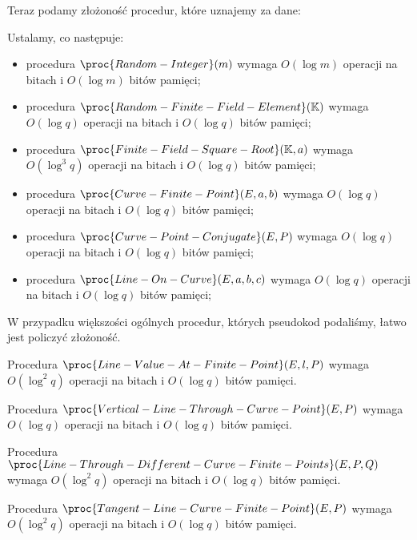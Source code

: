 \noindent
Teraz podamy złożoność procedur, które uznajemy za dane:

\begin{remark}
Ustalamy, co następuje:
\begin{itemize}
\item
procedura $\proc{Random-Integer}(m)$ wymaga
$O(\log m)$ operacji na bitach i $O(\log m)$ bitów pamięci;
\item
procedura $\proc{Random-Finite-Field-Element}(\K)$ wymaga
$O(\log q)$ operacji na bitach i $O(\log q)$ bitów pamięci;
\item
procedura $\proc{Finite-Field-Square-Root}(\K, a)$ wymaga
$O(\log^3 q)$ operacji na bitach i $O(\log q)$ bitów pamięci;
\item
procedura $\proc{Curve-Finite-Point}(E, a, b)$ wymaga
$O(\log q)$ operacji na bitach i $O(\log q)$ bitów pamięci;
\item
procedura $\proc{Curve-Point-Conjugate}(E, P)$ wymaga
$O(\log q)$ operacji na bitach \linebreak i $O(\log q)$ bitów pamięci;
\item
procedura $\proc{Line-On-Curve}(E, a, b, c)$ wymaga
$O(\log q)$ operacji na bitach i $O(\log q)$ bitów pamięci;
\end{itemize}
\end{remark}

\noindent
W przypadku większości ogólnych procedur, których pseudokod podaliśmy,
łatwo jest policzyć złożoność.

\begin{fact}
Procedura $\proc{Line-Value-At-Finite-Point}(E, l, P)$ wymaga
$O(\log^2 q)$ operacji na bitach i $O(\log q)$ bitów pamięci.
\end{fact}

\begin{fact}
Procedura $\proc{Vertical-Line-Through-Curve-Point}(E, P)$ wymaga
$O(\log q)$ operacji na bitach i $O(\log q)$ bitów pamięci.
\end{fact}

\begin{fact}
Procedura $\proc{Line-Through-Different-Curve-Finite-Points}(E, P, Q)$ wymaga
$O(\log^2 q)$ operacji na bitach i $O(\log q)$ bitów pamięci.
\end{fact}

\begin{fact}
Procedura $\proc{Tangent-Line-Curve-Finite-Point}(E, P)$ wymaga
$O(\log^2 q)$ operacji na bitach i $O(\log q)$ bitów pamięci.
\end{fact}

